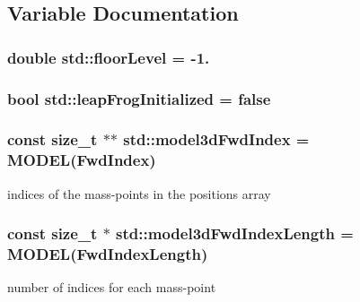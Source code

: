 \subsection{Variable Documentation}
\hypertarget{namespacestd_a3a4f9480c35c84159c4009b499c3eea6}{}
\subsubsection[{floor\+Level}]{\setlength{\rightskip}{0pt plus 5cm}double std\+::floor\+Level = -\/1.}\label{namespacestd_a3a4f9480c35c84159c4009b499c3eea6}
\hypertarget{namespacestd_a46133dbc6d449430af9f3e4b497f0d19}{}
\subsubsection[{leap\+Frog\+Initialized}]{\setlength{\rightskip}{0pt plus 5cm}bool std\+::leap\+Frog\+Initialized = false}\label{namespacestd_a46133dbc6d449430af9f3e4b497f0d19}
\hypertarget{namespacestd_a339638085d29cb13db371a07634085c6}{}
\subsubsection[{model3d\+Fwd\+Index}]{\setlength{\rightskip}{0pt plus 5cm}const size\+\_\+t $\ast$$\ast$ std\+::model3d\+Fwd\+Index = {\bf M\+O\+D\+E\+L}(Fwd\+Index)}\label{namespacestd_a339638085d29cb13db371a07634085c6}


indices of the mass-\/points in the positions array 

\hypertarget{namespacestd_a0ff16d332f71a0822fb8570c16df06ff}{}
\subsubsection[{model3d\+Fwd\+Index\+Length}]{\setlength{\rightskip}{0pt plus 5cm}const size\+\_\+t $\ast$ std\+::model3d\+Fwd\+Index\+Length = {\bf M\+O\+D\+E\+L}(Fwd\+Index\+Length)}\label{namespacestd_a0ff16d332f71a0822fb8570c16df06ff}


number of indices for each mass-\/point 

